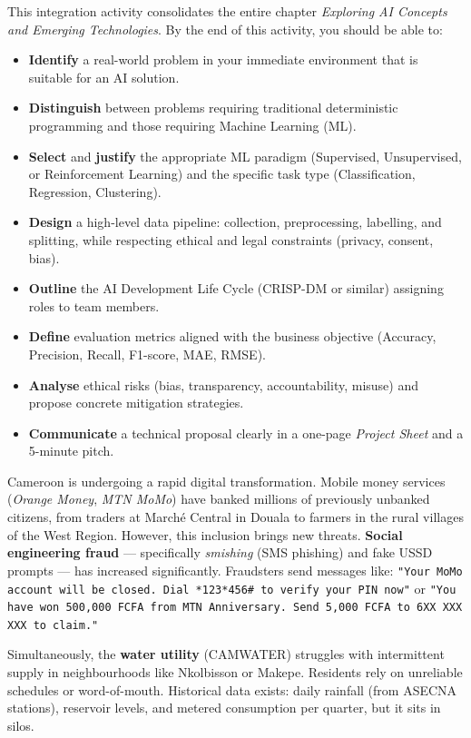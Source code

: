 \documentclass[11pt]{article}
\newcounter{popsec}
\newcounter{popsub}
\newcommand{\courssub}[1]{%
  \stepcounter{popsub}%
  \par\vspace{9pt}\noindent{\popxbold\fontsize{11.5}{13}\selectfont\color{popink}{\color{poporange}\thepopsec.\thepopsub}\hspace{6pt}#1}\par\nopagebreak\vspace{4pt}
}
\begin{document}
\courssub{Aims of the Activity}
This integration activity consolidates the entire chapter \emph{Exploring AI Concepts and Emerging Technologies}. By the end of this activity, you should be able to:
\begin{itemize}
    \item \textbf{Identify} a real-world problem in your immediate environment that is suitable for an AI solution.
    \item \textbf{Distinguish} between problems requiring traditional deterministic programming and those requiring Machine Learning (ML).
    \item \textbf{Select} and \textbf{justify} the appropriate ML paradigm (Supervised, Unsupervised, or Reinforcement Learning) and the specific task type (Classification, Regression, Clustering).
    \item \textbf{Design} a high-level data pipeline: collection, preprocessing, labelling, and splitting, while respecting ethical and legal constraints (privacy, consent, bias).
    \item \textbf{Outline} the AI Development Life Cycle (CRISP-DM or similar) assigning roles to team members.
    \item \textbf{Define} evaluation metrics aligned with the business objective (Accuracy, Precision, Recall, F1-score, MAE, RMSE).
    \item \textbf{Analyse} ethical risks (bias, transparency, accountability, misuse) and propose concrete mitigation strategies.
    \item \textbf{Communicate} a technical proposal clearly in a one-page \emph{Project Sheet} and a 5-minute pitch.
\end{itemize}

\courssub{Situation}
Cameroon is undergoing a rapid digital transformation. Mobile money services (\emph{Orange Money}, \emph{MTN MoMo}) have banked millions of previously unbanked citizens, from traders at Marché Central in Douala to farmers in the rural villages of the West Region. However, this inclusion brings new threats. \textbf{Social engineering fraud} — specifically \emph{smishing} (SMS phishing) and fake USSD prompts — has increased significantly. Fraudsters send messages like: \texttt{"Your MoMo account will be closed. Dial *123*456\# to verify your PIN now"} or \texttt{"You have won 500,000 FCFA from MTN Anniversary. Send 5,000 FCFA to 6XX XXX XXX to claim."}

Simultaneously, the \textbf{water utility} (CAMWATER) struggles with intermittent supply in neighbourhoods like Nkolbisson or Makepe. Residents rely on unreliable schedules or word-of-mouth. Historical data exists: daily rainfall (from ASECNA stations), reservoir levels, and metered consumption per quarter, but it sits in silos.
\end{document}
